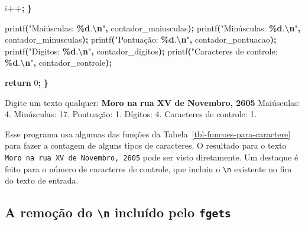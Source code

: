 \documentclass[
  11pt,
  a4paper,
]{scrbook}
\newenvironment{Shaded}{\begin{snugshade}}{\end{snugshade}}
\newcommand{\ControlFlowTok}[1]{\textcolor[rgb]{0.13,0.29,0.53}{\textbf{#1}}}
\newcommand{\DecValTok}[1]{\textcolor[rgb]{0.00,0.00,0.81}{#1}}
\newcommand{\KeywordTok}[1]{\textcolor[rgb]{0.13,0.29,0.53}{\textbf{#1}}}
\newcommand{\NormalTok}[1]{#1}
\newcommand{\OperatorTok}[1]{\textcolor[rgb]{0.81,0.36,0.00}{\textbf{#1}}}
\newcommand{\SpecialCharTok}[1]{\textcolor[rgb]{0.81,0.36,0.00}{\textbf{#1}}}
\newcommand{\StringTok}[1]{\textcolor[rgb]{0.31,0.60,0.02}{#1}}
\begin{document}
\begin{Shaded}
\begin{Highlighting}[]
\NormalTok{        i}\OperatorTok{++;}
    \OperatorTok{\}}

\NormalTok{    printf}\OperatorTok{(}\StringTok{"Maiúsculas: }\SpecialCharTok{\%d}\StringTok{.}\SpecialCharTok{\textbackslash{}n}\StringTok{"}\OperatorTok{,}\NormalTok{ contador\_maiusculas}\OperatorTok{);}
\NormalTok{    printf}\OperatorTok{(}\StringTok{"Minúsculas: }\SpecialCharTok{\%d}\StringTok{.}\SpecialCharTok{\textbackslash{}n}\StringTok{"}\OperatorTok{,}\NormalTok{ contador\_minusculas}\OperatorTok{);}
\NormalTok{    printf}\OperatorTok{(}\StringTok{"Pontuação: }\SpecialCharTok{\%d}\StringTok{.}\SpecialCharTok{\textbackslash{}n}\StringTok{"}\OperatorTok{,}\NormalTok{ contador\_pontuacao}\OperatorTok{);}
\NormalTok{    printf}\OperatorTok{(}\StringTok{"Dígitos: }\SpecialCharTok{\%d}\StringTok{.}\SpecialCharTok{\textbackslash{}n}\StringTok{"}\OperatorTok{,}\NormalTok{ contador\_digitos}\OperatorTok{);}
\NormalTok{    printf}\OperatorTok{(}\StringTok{"Caracteres de controle: }\SpecialCharTok{\%d}\StringTok{.}\SpecialCharTok{\textbackslash{}n}\StringTok{"}\OperatorTok{,}\NormalTok{ contador\_controle}\OperatorTok{);}

    \ControlFlowTok{return} \DecValTok{0}\OperatorTok{;}
\OperatorTok{\}}
\end{Highlighting}
\end{Shaded}

\begin{Shaded}
\begin{Highlighting}[]
\NormalTok{Digite um texto qualquer:}
\KeywordTok{ Moro na rua XV de Novembro, 2605 }
\NormalTok{Maiúsculas: 4.}
\NormalTok{Minúsculas: 17.}
\NormalTok{Pontuação: 1.}
\NormalTok{Dígitos: 4.}
\NormalTok{Caracteres de controle: 1.}
\end{Highlighting}
\end{Shaded}

Esse programa usa algumas das funções da
Tabela~\ref{tbl-funcoes-para-caractere} para fazer a contagem de alguns
tipos de caracteres. O resultado para o texto
\texttt{Moro\ na\ rua\ XV\ de\ Novembro,\ 2605} pode ser visto
diretamente. Um destaque é feito para o número de caracteres de
controle, que incluiu o \texttt{\textbackslash{}n} existente no fim do
texto de entrada.

\subsection{\texorpdfstring{A remoção do \texttt{\textbackslash{}n}
incluído pelo
\texttt{fgets}}{A remoção do \textbackslash n incluído pelo fgets}}\label{a-remouxe7uxe3o-do-n-incluuxeddo-pelo-fgets}
\end{document}
